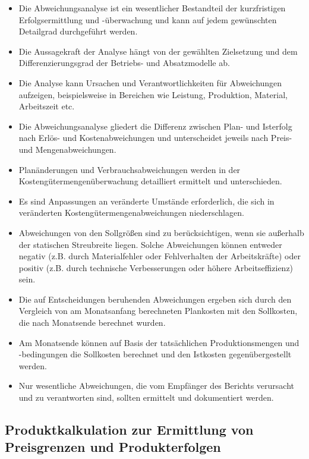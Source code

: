 \begin{itemize}
    \item Die Abweichungsanalyse ist ein wesentlicher Bestandteil der kurzfristigen Erfolgsermittlung und -überwachung und kann auf jedem gewünschten Detailgrad durchgeführt werden.
    \item Die Aussagekraft der Analyse hängt von der gewählten Zielsetzung und dem Differenzierungsgrad der Betriebs- und Absatzmodelle ab.
    \item Die Analyse kann Ursachen und Verantwortlichkeiten für Abweichungen aufzeigen, beispielsweise in Bereichen wie Leistung, Produktion, Material, Arbeitszeit etc.
    \item Die Abweichungsanalyse gliedert die Differenz zwischen Plan- und Isterfolg nach Erlös- und Kostenabweichungen und unterscheidet jeweils nach Preis- und Mengenabweichungen.
    \item Planänderungen und Verbrauchsabweichungen werden in der Kostengütermengenüberwachung detailliert ermittelt und unterschieden.
    \item Es sind Anpassungen an veränderte Umstände erforderlich, die sich in veränderten Kostengütermengenabweichungen niederschlagen.
    \item Abweichungen von den Sollgrö{\ss}en sind zu berücksichtigen, wenn sie au{\ss}erhalb der statischen Streubreite liegen. Solche Abweichungen können entweder negativ (z.B. durch Materialfehler oder Fehlverhalten der Arbeitskräfte) oder positiv (z.B. durch technische Verbesserungen oder höhere Arbeitseffizienz) sein.
    \item Die auf Entscheidungen beruhenden Abweichungen ergeben sich durch den Vergleich von am Monatsanfang berechneten Plankosten mit den Sollkosten, die nach Monatsende berechnet wurden.
    \item Am Monatsende können auf Basis der tatsächlichen Produktionsmengen und -bedingungen die Sollkosten berechnet und den Istkosten gegenübergestellt werden. 
    \item Nur wesentliche Abweichungen, die vom Empfänger des Berichts verursacht und zu verantworten sind, sollten ermittelt und dokumentiert werden.
\end{itemize}

\subsection{Produktkalkulation zur Ermittlung von Preisgrenzen und Produkterfolgen}

